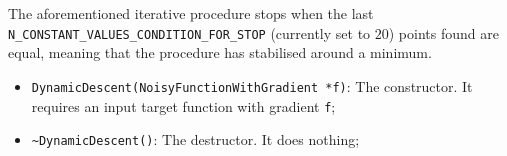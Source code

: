 \documentclass[11pt,a4paper,twoside]{article}
\begin{document}
The aforementioned iterative procedure stops when the last \verb+N_CONSTANT_VALUES_CONDITION_FOR_STOP+ (currently set to $20$) points found are equal, meaning that the procedure has stabilised around a minimum.

\begin{itemize}
\item \verb+DynamicDescent(NoisyFunctionWithGradient *f)+: The constructor. It requires an input target function with gradient \verb+f+;
\item \verb+~DynamicDescent()+: The destructor. It does nothing;
\end{itemize}




\printindex
\end{document}
